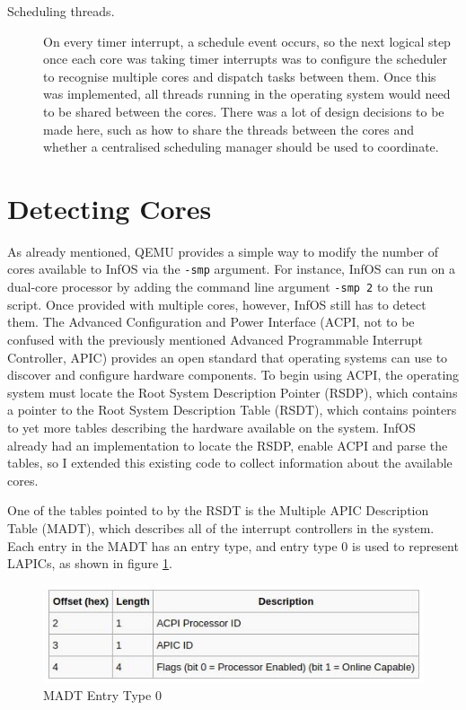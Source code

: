 \documentclass[bsc,frontabs,singlespacing,parskip,deptreport]{infthesis}
\begin{document}
\begin{description}
\item[Scheduling threads.] On every timer interrupt, a schedule event occurs, so the next logical step once each core was taking timer interrupts was to configure the scheduler to recognise multiple cores and dispatch tasks between them. Once this was implemented, all threads running in the operating system would need to be shared between the cores. There was a lot of design decisions to be made here, such as how to share the threads between the cores and whether a centralised scheduling manager should be used to coordinate.
\end{description}

\section{Detecting Cores} \label{detecting-cores}
As already mentioned, QEMU provides a simple way to modify the number of cores available to InfOS via the \verb|-smp| argument. For instance, InfOS can run on a dual-core processor by adding the command line argument \verb|-smp 2| to the run script. Once provided with multiple cores, however, InfOS still has to detect them. The Advanced Configuration and Power Interface (ACPI, not to be confused with the previously mentioned Advanced Programmable Interrupt Controller, APIC) provides an open standard that operating systems can use to discover and configure hardware components. To begin using ACPI, the operating system must locate the Root System Description Pointer (RSDP), which contains a pointer to the Root System Description Table (RSDT), which contains pointers to yet more tables describing the hardware available on the system. InfOS already had an implementation to locate the RSDP, enable ACPI and parse the tables, so I extended this existing code to collect information about the available cores. 

One of the tables pointed to by the RSDT is the Multiple APIC Description Table (MADT), which describes all of the interrupt controllers in the system. Each entry in the MADT has an entry type, and entry type 0 is used to represent LAPICs, as shown in figure \ref{madtentry0}. 

\begin{figure}[h]
    \centering
    \includegraphics[scale=0.7]{madtentry0.jpg}
    \caption{MADT Entry Type 0 \cite{osdev-madt}}
    \label{madtentry0}
\end{figure}
\end{document}
